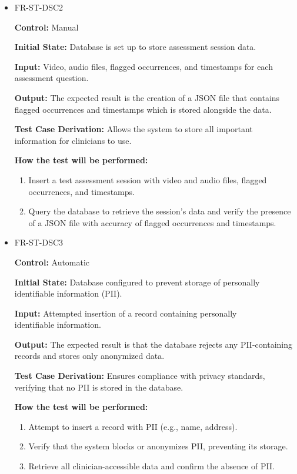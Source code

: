 \documentclass[12pt, titlepage]{article}
\begin{document}
\begin{itemize}
  \item FR-ST-DSC2
  \begin{mdframed}[linewidth=0.5mm]
      \textbf{Control:} Manual \par
      \textbf{Initial State:} Database is set up to store assessment session data. \par
      \textbf{Input:} Video, audio files, flagged occurrences, and timestamps for each assessment question. \par
      \textbf{Output:} The expected result is the creation of a JSON file that contains flagged occurrences and timestamps which is stored alongside the data. \par
      \textbf{Test Case Derivation:} Allows the system to store all important information for clinicians to use. \par
      \textbf{How the test will be performed:}
      \begin{enumerate}[noitemsep]
        \item Insert a test assessment session with video and audio files, flagged occurrences, and timestamps.
        \item Query the database to retrieve the session’s data and verify the presence of a JSON file with accuracy of flagged occurrences and timestamps.
      \end{enumerate}
  \end{mdframed}

  \item FR-ST-DSC3
  \begin{mdframed}[linewidth=0.5mm]
      \textbf{Control:} Automatic \par
      \textbf{Initial State:} Database configured to prevent storage of personally identifiable information (PII). \par
      \textbf{Input:} Attempted insertion of a record containing personally \\identifiable information. \par
      \textbf{Output:} The expected result is that the database rejects any PII-containing records and stores only anonymized data. \par
      \textbf{Test Case Derivation:} Ensures compliance with privacy standards, verifying that no PII is stored in the database. \par
      \textbf{How the test will be performed:}
      \begin{enumerate}[noitemsep]
        \item Attempt to insert a record with PII (e.g., name, address).
        \item Verify that the system blocks or anonymizes PII, preventing its storage.
        \item Retrieve all clinician-accessible data and confirm the absence of PII.
      \end{enumerate}
  \end{mdframed}


\end{itemize}
\end{document}
